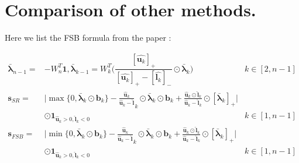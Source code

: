 \section{Comparison of other methods.}

\label{sec4p5}

Here we list the FSB formula from the paper \cite{FSB}:

\begin{align*}
	\bm{\bar{\lambda}}_{n-1} =& -W^T_n\bm{1},  	\bm{\bar{\lambda}}_{k-1} = W^T_k\big(\dfrac{[\hat{\bm{u}_k}]_+}{[\hat{\bm{u}_k}]_+-[\hat{\bm{l}_k}]_-}\odot\bm{\bar{\lambda}}_{k}\big) &k\in [2,n-1]\\
	\bm{s}_{SR} =& \lvert\max\{0,\bm{\bar{\lambda}}_{k}\odot\bm{b}_{k}\}-\frac{\hat{\bm{u}}_k}{\hat{\bm{u}}_k-\hat{\bm{l}}}_k\odot\bm{\bar{\lambda}}_{k}\odot\bm{{b}}_{k}+\frac{\hat{\bm{u}}_k\odot\hat{\bm{l}}_k}{\hat{\bm{u}}_k-\hat{\bm{l}}_k}\odot[\bm{\bar{\lambda}}_{k}]_+\rvert &\\
	&\odot\bm{1}_{\hat{\bm{u}}_k>0,\hat{\bm{l}}_k<0}&k\in [1,n-1]\\
	\bm{s}_{FSB} =& \lvert\min\{0,\bm{\bar{\lambda}}_{k}\odot\bm{b}_{k}\}-\frac{\hat{\bm{u}}_k}{\hat{\bm{u}}_k-\hat{\bm{l}}}_k\odot\bm{\bar{\lambda}}_{k}\odot\bm{{b}}_{k}+\frac{\hat{\bm{u}}_k\odot\hat{\bm{l}}_k}{\hat{\bm{u}}_k-\hat{\bm{l}}_k}\odot[\bm{\bar{\lambda}}_{k}]_+\rvert &\\
	&\odot\bm{1}_{\hat{\bm{u}}_k>0,\hat{\bm{l}}_k<0}&k\in [1,n-1]\\
\end{align*}



